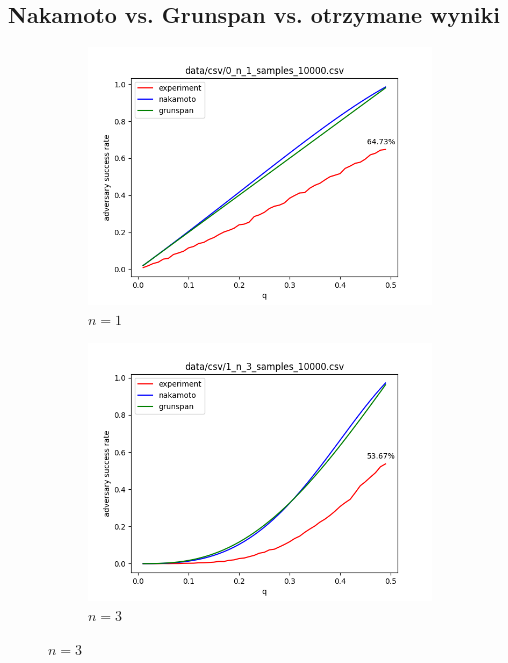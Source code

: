 \documentclass[a4paper,11pt]{article}
\theoremstyle{mytheor}
\begin{document}
\subsection*{Nakamoto vs. Grunspan vs. otrzymane wyniki}
\begin{figure}[H]
    \begin{subfigure}{0.5\textwidth}
        \includegraphics[width=1.0\linewidth]{0_n_1_samples_10000.png}
        \caption{$n = 1$}
        \label{fig:subim1}
    \end{subfigure}
    \begin{subfigure}{0.5\textwidth}
        \includegraphics[width=1.0\linewidth]{1_n_3_samples_10000.png}
        \caption{$n = 3$}
        \label{fig:subim2}
    \end{subfigure}


\end{figure}
\end{document}
